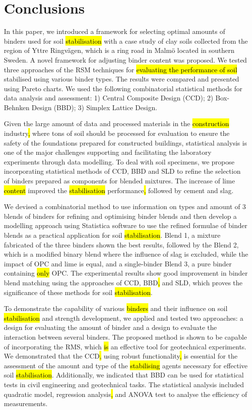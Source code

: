 \documentclass[eprint,
]{actapoly}
\begin{document}
\section{Conclusions}
In this paper, we introduced a framework for selecting optimal amounts of binders used for soil \hl{stabilisation} with a case study of clay soils collected from the region of Yttre Ringvägen, which is a ring road in Malmö located in southern Sweden. A novel framework for adjusting binder content was proposed. We tested three approaches of the RSM techniques for \hl{evaluating the performance of soil} stabilised using various binder types. The results were compared and presented using Pareto charts. We used the following combinatorial statistical methods for data analysis and assessment: 1) Central Composite Design (CCD); 2) Box-Behnken Design (BBD); 3) Simplex Lattice Design. 

Given the large amount of data and processed materials in the \hl{construction} industry\hl{, }where tons of soil should be processed for evaluation to ensure the safety of the foundations prepared for constructed buildings, statistical analysis is one of the major challenges supporting and facilitating the laboratory experiments through data modelling. To deal with soil specimens, we propose incorporating statistical methods of CCD, BBD and SLD to refine the selection of binders prepared as components for blended mixtures. The increase of lime \hl{content} improved the \hl{stabilisation} performance\hl{, }followed by cement and slag. 

We devised a combinatorial method to use information on types and amount of 3 blends of binders for refining and optimising binder blends and then develop a modelling approach using Statistica software to use the refined formulae of binder blends as a practical application for soil \hl{stabilisation}. Blend 1, a mixture fabricated of the three binders shown the best results, followed by the Blend 2, which is a modified binary blend where the influence of slag is excluded, while the impact of OPC and lime is equal, and a single-binder Blend 3, a pure binder containing \hl{only} OPC. The experimental results show good improvement in binder blend matching using the approaches of CCD, BBD\hl{, }and SLD, which proves the significance of these methods for soil \hl{stabilisation}.

To demonstrate the capability of various \hl{binders} and their influence on soil \hl{stabilisation} and strength development, we applied and tested two approaches: a design for evaluating the amount of binder and a design to evaluate the interaction between several binders. The proposed method is shown to be capable of incorporating the RMS, which \hl{is} an effective tool for geotechnical experiments. We demonstrated that the CCD\hl{, }using robust functionality\hl{, }is essential for the assessment of the amount and type of the \hl{stabilising} agents necessary for effective soil \hl{stabilisation}. Additionally, we indicated that BBD can be used for statistical tests in civil engineering and geotechnical tasks. The statistical analysis included quadratic model, regression analysis\hl{, }and ANOVA test to analyse the efficiency of measurements.
\end{document}
